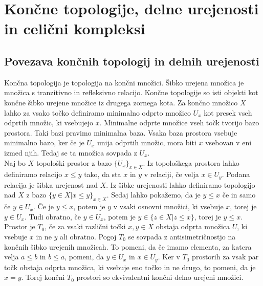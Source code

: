 \documentclass[a4paper, 12pt]{book}
\theoremstyle{definition}
\begin{document}
\chapter{Končne topologije, delne urejenosti in celični kompleksi}
\section{Povezava končnih topologij in delnih urejenosti}
Končna topologija je topologija na končni množici. Šibko urejena množica je
množica s tranzitivno in refleksivno relacijo. Končne topologije so isti objekti
kot končne šibko urejene množice iz drugega zornega kota. Za končno množico $X$ lahko
za vsako točko definiramo minimalno odprto množico $U_x$ kot presek vseh odprtih
množic, ki vsebujejo $x$. Minimalne odprte množice vseh točk tvorijo bazo prostora.
Taki bazi pravimo minimalna baza. Vsaka baza prostora vsebuje minimalno bazo,
ker če je $U_x$ unija odprtih množic, mora biti $x$ vsebovan v eni izmed njih.
Tedaj se ta množica sovpada z $U_x$.\\
Naj bo $X$ topološki prostor z bazo $\{U_x\}_{x \in X}$. Iz topološkega
prostora lahko definiramo relacijo $x \leq y$ tako, da sta $x$ in $y$ v relaciji,
če velja $x \in U_y$. Podana relacija je šibka urejenost nad $X$. Iz šibke urejenosti
lahko definiramo topologijo nad $X$ z bazo $\{y \in X | x \leq y\}_{x \in X}$.
Sedaj lahko pokažemo, da je $y \leq x$ če in samo če $y \in U_x$.
Če je $y \leq x$, potem je $y$ v vsaki osnovni množici, ki vsebuje $x$, torej je $y \in U_x$.
Tudi obratno, če $y \in U_x$, potem je $y \in \{z \in X | z \leq x\}$, torej  je $y \leq x$.\\
Prostor je $T_0$, če za vsaki različni točki $x,y \in X$ obstaja odprta množica
$U$, ki vsebuje $x$ in ne $y$ ali obratno. Pogoj $T_0$ se sovpada z antisimetričnostjo na
končnih šibko urejenih množicah. To pomeni, da če imamo elementa, za katera velja
$a \leq b$ in $b \leq a$, pomeni, da $y \in U_x$ in $x \in U_y$. Ker v $T_0$ prostorih
za vsak par točk obstaja odprta množica, ki vsebuje eno točko in ne drugo, to pomeni,
da je $x = y$. Torej končni $T_0$ prostori so ekvivalentni končni delno urejeni
množici.\\
\end{document}
